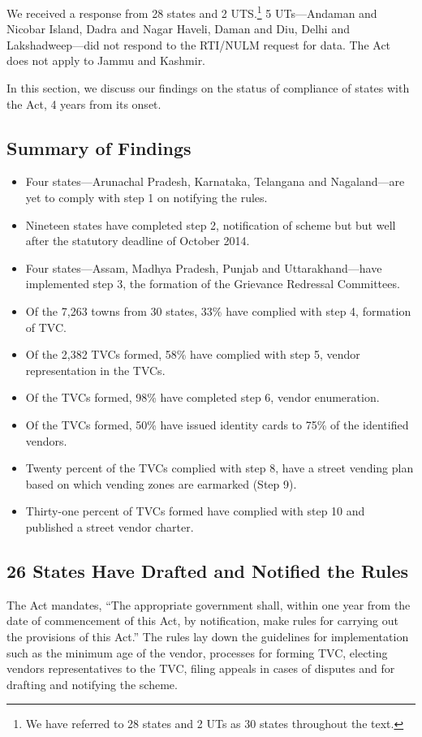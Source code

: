 \documentclass[a4paper, 12pt, twoside]{article}
\begin{document}
{	We received a response from 28 states and 2 UTS.\footnote{ We have referred to 28 states and 2 UTs as 30 states throughout the text.} 5 UTs—Andaman and Nicobar Island, Dadra and Nagar Haveli, Daman and Diu, Delhi and Lakshadweep—did not respond to the RTI/NULM request for data. The Act does not apply to Jammu and Kashmir.

	In this section, we discuss our findings on the status of compliance of states with the Act, 4 years from its onset.

\subsection*{Summary of Findings}

\begin{itemize}
	\item Four states—Arunachal Pradesh, Karnataka, Telangana and Nagaland—are yet to comply with step 1 on notifying the rules.
	\item Nineteen states have completed step 2, notification of scheme but but well after the statutory deadline of October 2014.
	\item Four states—Assam, Madhya Pradesh, Punjab and Uttarakhand—have implemented step 3, the formation of the Grievance Redressal Committees.
	\item Of the 7,263 towns from 30 states, 33\% have complied with step 4, formation of TVC.
	\item Of the 2,382 TVCs formed, 58\% have complied with step 5, vendor representation in the TVCs.
	\item Of the TVCs formed, 98\% have completed step 6, vendor enumeration.
	\item Of the TVCs formed, 50\% have issued identity cards to 75\% of the identified vendors.
	\item Twenty percent of the TVCs complied with step 8, have a street vending plan based on which vending zones are earmarked (Step 9).
	\item Thirty-one percent of TVCs formed have complied with step 10 and published a street vendor charter.
\end{itemize}

\subsection*{26 States Have Drafted and Notified the Rules}
	The Act mandates, “The appropriate government shall, within one year from the date of commencement of this Act, by notification, make rules for carrying out the provisions of this Act.” The rules lay down the guidelines for implementation such as the minimum age of the vendor, processes for forming TVC, electing vendors representatives to the TVC, filing appeals in cases of disputes and for drafting and notifying the scheme.

}
\end{document}
